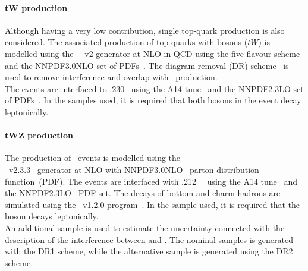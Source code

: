 \paragraph{tW production} 
Although having a very low contribution, single top-quark production is also considered.
The associated production of top-quarks with \PW bosons ($tW$) is
modelled using the
\powhegbox~\cite{Re:2010bp,Nason:2004rx,Frixione:2007vw,Alioli:2010xd}~v2
generator at NLO in QCD using the five-flavour scheme and the
\textsc{NNPDF3.0NLO} set of PDFs~\cite{Ball:2014uwa}.
The diagram removal (DR) scheme~\cite{Frixione:2008yi} is used to
remove interference and overlap with \ttbar\ production.\\ 
The events are interfaced to \pythia.230~\cite{Sjostrand:2014zea} using the A14
tune~\cite{ATL-PHYS-PUB-2014-021} and the \textsc{NNPDF2.3LO} set of
PDFs~\cite{Ball:2012cx}.
In the samples used, it is required that both \PW bosons in the event decay leptonically. 

\paragraph{tWZ production} 
The production of \tWZ\ events is modelled using the \\ \mgamc~v2.3.3~\cite{Alwall:2014hca}
generator at NLO with \textsc{NNPDF3.0NLO}~\cite{Ball:2014uwa} parton distribution function~(PDF).
The events are interfaced with \pythia.212~\cite{Sjostrand:2014zea}~ using the A14 tune~\cite{ATL-PHYS-PUB-2014-021} and the \textsc{NNPDF2.3LO}~\cite{Ball:2014uwa} PDF set.
The decays of bottom and charm hadrons are simulated using the \evtgen\ v1.2.0 program~\cite{EvtGen}. 
In the sample used, it is required that the \PZ boson decays leptonically. \\
An additional \tWZ sample is used to estimate the uncertainty connected with the description of the interference between \ttZ and \tWZ. The nominal samples is generated with the DR1 scheme, while the alternative sample is generated using the DR2 scheme.

